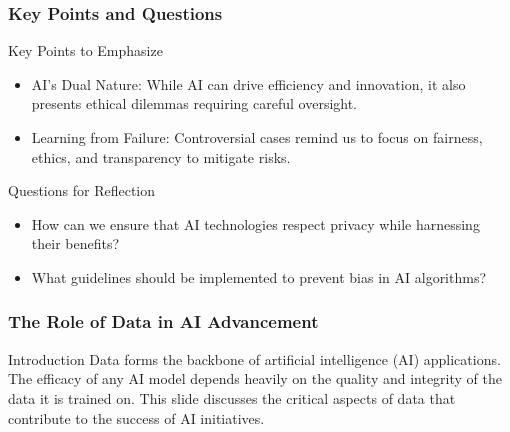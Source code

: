 \documentclass[aspectratio=169]{beamer}
\begin{document}
\begin{frame}[fragile]
  \frametitle{Key Points and Questions}
  \begin{block}{Key Points to Emphasize}
    \begin{itemize}
      \item AI's Dual Nature: While AI can drive efficiency and innovation, it also presents ethical dilemmas requiring careful oversight.
      \item Learning from Failure: Controversial cases remind us to focus on fairness, ethics, and transparency to mitigate risks.
    \end{itemize}
  \end{block}

  \begin{block}{Questions for Reflection}
    \begin{itemize}
      \item How can we ensure that AI technologies respect privacy while harnessing their benefits?
      \item What guidelines should be implemented to prevent bias in AI algorithms?
    \end{itemize}
  \end{block}
\end{frame}

\begin{frame}[fragile]
  \frametitle{The Role of Data in AI Advancement}
  \begin{block}{Introduction}
    Data forms the backbone of artificial intelligence (AI) applications. The efficacy of any AI model depends heavily on the quality and integrity of the data it is trained on. This slide discusses the critical aspects of data that contribute to the success of AI initiatives.
  \end{block}
\end{frame}
\end{document}
